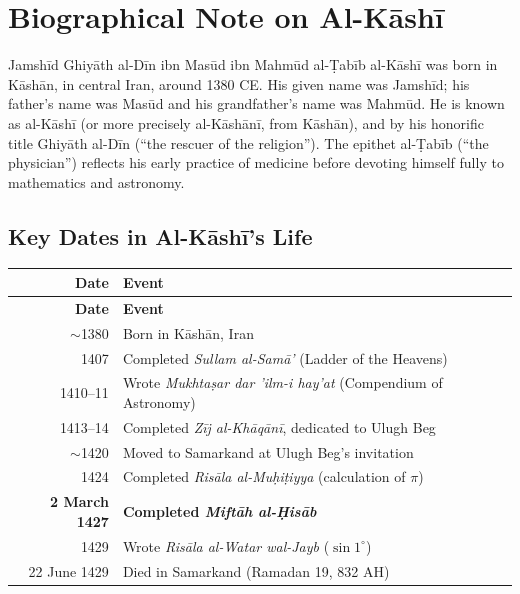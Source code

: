 \documentclass[11pt,a4paper]{article}
\begin{document}
\appendix
\section{Biographical Note on Al-K\=ash\=i}
\label{app:biography}

Jamsh\=id Ghiy\=ath al-D\=in ibn Mas\=ud ibn Mahm\=ud al-\d{T}ab\=ib al-K\=ash\=i was
born in K\=ash\=an, in central Iran, around 1380 CE. His given name was
Jamsh\=id; his father's name was Mas\=ud and his grandfather's name was
Mahm\=ud. He is known as al-K\=ash\=i (or more precisely al-K\=ash\=an\=i, from
K\=ash\=an), and by his honorific title Ghiy\=ath al-D\=in (``the rescuer of
the religion''). The epithet al-\d{T}ab\=ib (``the physician'') reflects his
early practice of medicine before devoting himself fully to mathematics
and astronomy.

\subsection{Key Dates in Al-K\=ash\=i's Life}

\begin{longtable}{|r|l|}
\hline
\textbf{Date} & \textbf{Event} \\
\hline
\endfirsthead
\hline
\textbf{Date} & \textbf{Event} \\
\hline
\endhead
$\sim$1380 & Born in K\=ash\=an, Iran \\
\hline
1407 & Completed \textit{Sullam al-Sam\=a'} (Ladder of the Heavens) \\
\hline
1410--11 & Wrote \textit{Mukhta\d{s}ar dar 'ilm-i hay'at} (Compendium of
Astronomy) \\
\hline
1413--14 & Completed \textit{Z\=ij al-Kh\=aq\=an\=i}, dedicated to Ulugh Beg \\
\hline
$\sim$1420 & Moved to Samarkand at Ulugh Beg's invitation \\
\hline
1424 & Completed \textit{Ris\=ala al-Mu\d{h}i\d{t}iyya} (calculation of $\pi$)
\\
\hline
\textbf{2 March 1427} & \textbf{Completed \textit{Mift\=ah al-\d{H}is\=ab}} \\
\hline
1429 & Wrote \textit{Ris\=ala al-Watar wal-Jayb} ($\sin 1^\circ$) \\
\hline
22 June 1429 & Died in Samarkand (Ramadan 19, 832 AH) \\
\hline
\end{longtable}
\end{document}
